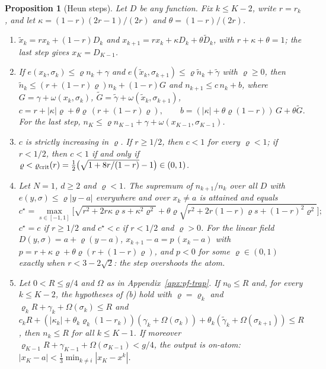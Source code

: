 \documentclass{article} %
\theoremstyle{plain}
\newtheorem{proposition}[theorem]{Proposition}
\theoremstyle{definition}
\theoremstyle{remark}
\begin{document}
\begin{proposition}[Heun steps]
\label{prop:heun}
Let $D$ be any function. Fix $k\le K-2$, write $r=r_k$, and let
$\kappa=(1-r)(2r-1)/(2r)$ and $\theta=(1-r)/(2r)$.
\begin{enumerate}[label=(\alph*),leftmargin=2em]
\item $\tilde x_k=rx_k+(1-r)D_k$ and $x_{k+1}=rx_k+\kappa D_k+\theta\tilde D_k$, with
  $r+\kappa+\theta=1$; the last step gives $x_K=D_{K-1}$.
\item If $e(x_k,\sigma_k)\le\varrho n_k+\gamma$ and $e(\tilde x_k,\sigma_{k+1})\le\varrho\tilde n_k+\tilde\gamma$
  with $\varrho\ge0$, then $\tilde n_k\le(r+(1-r)\varrho)n_k+(1-r)G$ and $n_{k+1}\le c\,n_k+b$, where
  $G=\gamma+\omega(x_k,\sigma_k)$, $\tilde G=\tilde\gamma+\omega(\tilde x_k,\sigma_{k+1})$,
  \[
  c=r+|\kappa|\varrho+\theta\varrho\,(r+(1-r)\varrho),\qquad
  b=(|\kappa|+\theta\varrho(1-r))\,G+\theta\tilde G .
  \]
  For the last step, $n_K\le\varrho n_{K-1}+\gamma+\omega(x_{K-1},\sigma_{K-1})$.
\item $c$ is strictly increasing in $\varrho$. If $r\ge1/2$, then $c<1$ for every $\varrho<1$; if
  $r<1/2$, then $c<1$ if and only if
  $\varrho<\varrho_{\rm crit}(r)=\tfrac12\big(\sqrt{1+8r/(1-r)}-1\big)\in(0,1)$.
\item Let $N=1$, $d\ge2$ and $\varrho<1$. The supremum of $n_{k+1}/n_k$ over all $D$ with
  $e(y,\sigma)\le\varrho|y-a|$ everywhere and over $x_k\ne a$ is attained and equals
  \[
  c^\star=\max_{s\in[-1,1]}\Big[\sqrt{r^2+2r\kappa\varrho s+\kappa^2\varrho^2}
  +\theta\varrho\sqrt{r^2+2r(1-r)\varrho s+(1-r)^2\varrho^2}\Big];
  \]
  $c^\star=c$ if $r\ge1/2$ and $c^\star<c$ if $r<1/2$ and $\varrho>0$. For the linear field
  $D(y,\sigma)=a+\varrho(y-a)$, $x_{k+1}-a=p\,(x_k-a)$ with $p=r+\kappa\varrho+\theta\varrho(r+(1-r)\varrho)$,
  and $p<0$ for some $\varrho\in(0,1)$ exactly when $r<3-2\sqrt2$: the step overshoots the atom.
\item Let $0<R\le g/4$ and $\Omega$ as in Appendix~\ref{apx:pf-trap}. If $n_0\le R$ and, for every
  $k\le K-2$, the hypotheses of (b) hold with $\varrho=\varrho_k$ and
  $\varrho_kR+\gamma_k+\Omega(\sigma_k)\le R$ and
  $c_kR+(|\kappa_k|+\theta_k\varrho_k(1-r_k))(\gamma_k+\Omega(\sigma_k))+\theta_k(\tilde\gamma_k+\Omega(\sigma_{k+1}))\le R$,
  then $n_k\le R$ for all $k\le K-1$. If moreover
  $\varrho_{K-1}R+\gamma_{K-1}+\Omega(\sigma_{K-1})<g/4$, the output is on-atom:
  $|x_K-a|<\tfrac13\min_{k\ne i}|x_K-x^k|$.
\end{enumerate}
\end{proposition}
\end{document}
